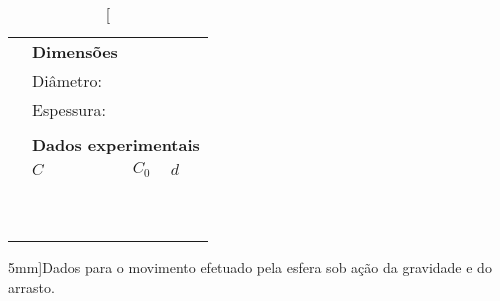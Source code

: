 \begin{table*}[!h]
\centering
\begin{tabular}{lp{25mm}p{25mm}p{25mm}l}
\toprule
	& \multicolumn{2}{l}{\textbf{Dimensões}} \\
	\cmidrule{2-3}
	& Diâmetro: \cellcolor[gray]{0.89} & \cellcolor[gray]{0.92} \\
	& Espessura: \cellcolor[gray]{0.95} & \cellcolor[gray]{0.97} \\
	\cmidrule{2-3}
\\
	& \multicolumn{4}{l}{\textbf{Dados experimentais}} \\
	\cmidrule{2-4}
	& $C$ & $C_0$ & $d$ & \\
	\cmidrule{2-4}
	& \cellcolor[gray]{0.89} & \cellcolor[gray]{0.92} & \cellcolor[gray]{0.89} & \\
	& \cellcolor[gray]{0.95} & \cellcolor[gray]{0.97} & \cellcolor[gray]{0.95} & \\
	& \cellcolor[gray]{0.89} & \cellcolor[gray]{0.92} & \cellcolor[gray]{0.89} & \\
	& \cellcolor[gray]{0.95} & \cellcolor[gray]{0.97} & \cellcolor[gray]{0.95} & \\
	& \cellcolor[gray]{0.89} & \cellcolor[gray]{0.92} & \cellcolor[gray]{0.89} & \\
	& \cellcolor[gray]{0.95} & \cellcolor[gray]{0.97} & \cellcolor[gray]{0.95} & \\
	& \cellcolor[gray]{0.89} & \cellcolor[gray]{0.92} & \cellcolor[gray]{0.89} & \\
	& \cellcolor[gray]{0.95} & \cellcolor[gray]{0.97} & \cellcolor[gray]{0.95} & \\
	& \cellcolor[gray]{0.89} & \cellcolor[gray]{0.92} & \cellcolor[gray]{0.89} & \\
	& \cellcolor[gray]{0.95} & \cellcolor[gray]{0.97} & \cellcolor[gray]{0.95} & \\
	\cmidrule{2-4}
\bottomrule
\end{tabular}
\caption[][5mm]{Dados para o movimento efetuado pela esfera sob ação da gravidade e do arrasto.}
\label{Tab:ValoresCapacitancia}
\end{table*}


